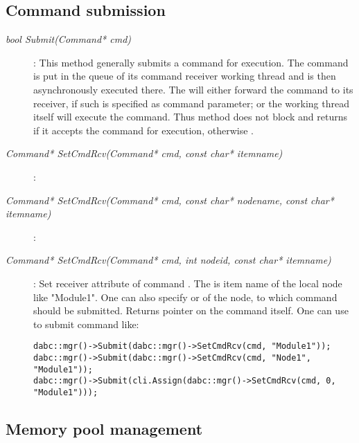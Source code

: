 \subsection{Command submission}	 
\label{prog_manager_framework_commands}	
\begin{description}
 
\item[\em bool Submit\small (Command* cmd)] :
This method generally submits a command  for execution.
The command is put in the queue of its command receiver working thread and is
then asynchronously executed there. The  will either forward the command
to its receiver, if such is specified as command parameter; or the  working thread itself will execute the command.
Thus method does not block and returns  if it accepts the command for execution, otherwise . 
      

\item[\em Command* SetCmdRcv\small (Command* cmd, const char* itemname)] :
\item[\em Command* SetCmdRcv\small (Command* cmd, const char* nodename, const char* itemname)] :
\item[\em Command* SetCmdRcv\small (Command* cmd, int nodeid, const char* itemname)] :
Set receiver attribute of command . The  is
item name of the local node like "Module1". One can also specify 
 or  of the node, to which command should be submitted.
Returns pointer on the command itself.
One can use  to submit command like:
\begin{small}
\begin{verbatim}
dabc::mgr()->Submit(dabc::mgr()->SetCmdRcv(cmd, "Module1"));
dabc::mgr()->Submit(dabc::mgr()->SetCmdRcv(cmd, "Node1", "Module1"));
dabc::mgr()->Submit(cli.Assign(dabc::mgr()->SetCmdRcv(cmd, 0, "Module1")));
\end{verbatim}
\end{small}


\end{description}
 
\subsection{Memory pool management}	 	   

